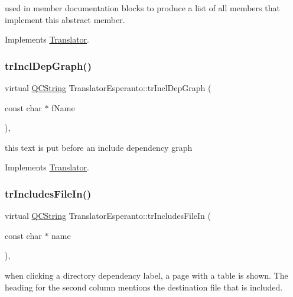used in member documentation blocks to produce a list of all members that implement this abstract member. 

Implements \mbox{\hyperlink{class_translator}{Translator}}.

\mbox{\label{class_translator_esperanto_af49d8724e51a1f4ad67ef3d289057273}} 
\subsubsection{\texorpdfstring{trInclDepGraph()}{trInclDepGraph()}}
{\footnotesize\ttfamily virtual \mbox{\hyperlink{class_q_c_string}{Q\+C\+String}} Translator\+Esperanto\+::tr\+Incl\+Dep\+Graph (\begin{DoxyParamCaption}\item[{const char $\ast$}]{f\+Name }\end{DoxyParamCaption})\hspace{0.3cm}{\ttfamily [inline]}, {\ttfamily [virtual]}}

this text is put before an include dependency graph 

Implements \mbox{\hyperlink{class_translator}{Translator}}.

\mbox{\label{class_translator_esperanto_ab30224c50f9b3647f285fea68532456a}} 
\subsubsection{\texorpdfstring{trIncludesFileIn()}{trIncludesFileIn()}}
{\footnotesize\ttfamily virtual \mbox{\hyperlink{class_q_c_string}{Q\+C\+String}} Translator\+Esperanto\+::tr\+Includes\+File\+In (\begin{DoxyParamCaption}\item[{const char $\ast$}]{name }\end{DoxyParamCaption})\hspace{0.3cm}{\ttfamily [inline]}, {\ttfamily [virtual]}}

when clicking a directory dependency label, a page with a table is shown. The heading for the second column mentions the destination file that is included. 

